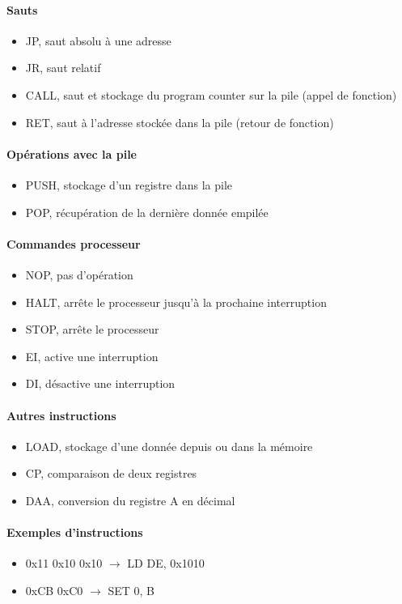 \documentclass[a4paper]{article}
\begin{document}
\paragraph{Sauts}
\begin{itemize}[label=\textbullet]
	\item JP, saut absolu à une adresse
	\item JR, saut relatif
	\item CALL, saut et stockage du program counter sur la pile (appel de fonction)
	\item RET, saut à l'adresse stockée dans la pile (retour de fonction)
\end{itemize}
\paragraph{Opérations avec la pile}
\begin{itemize}[label=\textbullet]
	\item PUSH, stockage d'un registre dans la pile
	\item POP, récupération de la dernière donnée empilée
\end{itemize}
\paragraph{Commandes processeur}
\begin{itemize}[label=\textbullet]
	\item NOP, pas d'opération
	\item HALT, arrête le processeur jusqu'à la prochaine interruption
	\item STOP, arrête le processeur
	\item EI, active une interruption
	\item DI, désactive une interruption
\end{itemize}
\paragraph{Autres instructions}
\begin{itemize}[label=\textbullet]
	\item LOAD, stockage d'une donnée depuis ou dans la mémoire
	\item CP, comparaison de deux registres
	\item DAA, conversion du registre A en décimal
\end{itemize}

\paragraph{Exemples d'instructions}
\begin{itemize}[label=\textbullet]
	\item 0x11 0x10 0x10 $\rightarrow$ LD DE, 0x1010
	\item 0xCB 0xC0 $\rightarrow$ SET 0, B
\end{itemize}
\end{document}
